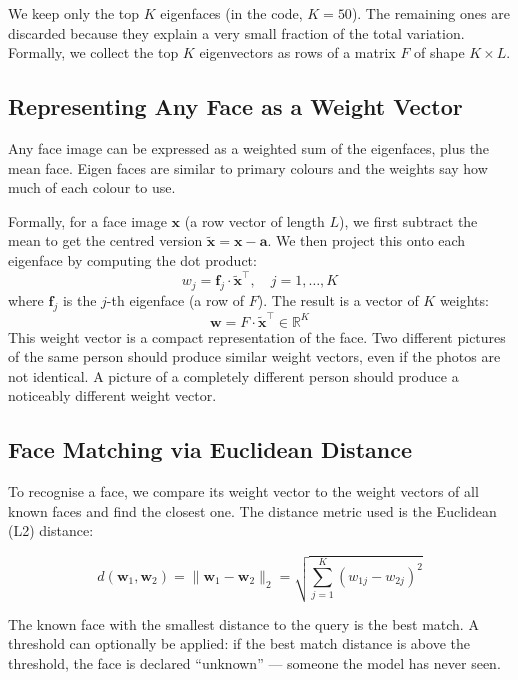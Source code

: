 \documentclass[12pt,a4paper]{article}
\begin{document}
We keep only the top $K$ eigenfaces (in the code, $K = 50$). The remaining ones
are discarded because they explain a very small fraction of the total variation.
Formally, we collect the top $K$ eigenvectors as rows of a matrix $F$ of shape
$K \times L$.

\newpage
{}
\subsection{Representing Any Face as a Weight Vector}

Any face image can be
expressed as a weighted sum of the eigenfaces, plus the mean face. Eigen faces are similar to primary colours  and the weights say how much of each colour to use.

Formally, for a face image $\mathbf{x}$ (a row vector of length $L$), we
first subtract the mean to get the centred version
$\tilde{\mathbf{x}} = \mathbf{x} - \mathbf{a}$.
We then project this onto each eigenface by computing the dot product:
\[
    w_j = \mathbf{f}_j \cdot \tilde{\mathbf{x}}^{\top}, \quad j = 1, \ldots, K
\]
where $\mathbf{f}_j$ is the $j$-th eigenface (a row of $F$). The result is a
vector of $K$ weights:
\[
\mathbf{w} = F \cdot \tilde{\mathbf{x}}^{\top} \in \mathbb{R}^{K}
\]
This weight vector is a compact representation of the face. Two different
pictures of the same person should produce similar weight vectors, even if
the photos are not identical. A picture of a completely different person
should produce a noticeably different weight vector.

\subsection{Face Matching via Euclidean Distance}

To recognise a face, we compare its weight vector to the weight vectors of all
known faces and find the closest one. The distance metric used is the
Euclidean (L2) distance:

\[
d(\mathbf{w}_1, \mathbf{w}_2) = \|\mathbf{w}_1 - \mathbf{w}_2\|_2 =
\sqrt{\sum_{j=1}^{K}(w_{1j} - w_{2j})^2}
\]

The known face with the smallest distance to the query is the best match.
A threshold can optionally be applied: if the best match distance is above
the threshold, the face is declared ``unknown'' --- someone the model has
never seen.

\newpage
\end{document}
